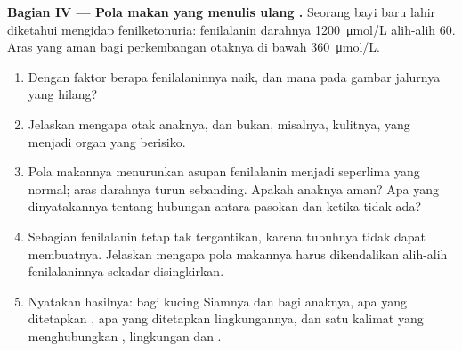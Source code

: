 \begin{problem}
\medskip
\noindent\textbf{Bagian IV --- Pola makan yang menulis ulang .}
Seorang bayi baru lahir diketahui mengidap fenilketonuria: fenilalanin
darahnya \qty{1200}{\micro mol/L} alih-alih \num{60}. Aras yang aman
bagi perkembangan otaknya di bawah \qty{360}{\micro mol/L}.
\begin{enumerate}[resume]
  \item Dengan faktor berapa fenilalaninnya naik, dan  mana pada
        gambar jalurnya yang hilang?
  \item Jelaskan mengapa otak anaknya, dan bukan, misalnya, kulitnya,
        yang menjadi organ yang berisiko.
  \item Pola makannya menurunkan asupan fenilalanin menjadi seperlima
        yang normal; aras darahnya turun sebanding. Apakah anaknya
        aman? Apa yang dinyatakannya tentang hubungan antara pasokan
         dan  ketika  tidak ada?
  \item Sebagian fenilalanin tetap tak tergantikan, karena tubuhnya
        tidak dapat membuatnya. Jelaskan mengapa pola makannya harus
        dikendalikan alih-alih fenilalaninnya sekadar disingkirkan.
  \item Nyatakan hasilnya: bagi kucing Siamnya dan bagi anaknya, apa
        yang ditetapkan , apa yang ditetapkan lingkungannya,
        dan satu kalimat yang menghubungkan , lingkungan dan .
\end{enumerate}
\end{problem}
